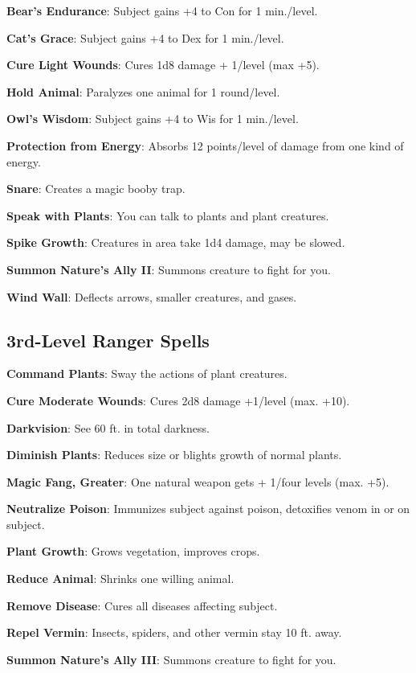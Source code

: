 \textbf{Bear's Endurance}: Subject gains +4 to Con for 1 min./level.

\textbf{Cat's Grace}: Subject gains +4 to Dex for 1 min./level.

\textbf{Cure Light Wounds}: Cures 1d8 damage + 1/level (max +5).

\textbf{Hold Animal}: Paralyzes one animal for 1 round/level.

\textbf{Owl's Wisdom}: Subject gains +4 to Wis for 1 min./level.

\textbf{Protection from Energy}: Absorbs 12 points/level of damage from one kind of energy.

\textbf{Snare}: Creates a magic booby trap.

\textbf{Speak with Plants}: You can talk to plants and plant creatures.

\textbf{Spike Growth}: Creatures in area take 1d4 damage, may be slowed\textit{.}

\textbf{Summon Nature's Ally II}: Summons creature to fight for you.

\textbf{Wind Wall}: Deflects arrows, smaller creatures, and gases.

\subsection{3rd-Level Ranger Spells}


\textbf{Command Plants}: Sway the actions of plant creatures.

\textbf{Cure Moderate Wounds}: Cures 2d8 damage +1/level (max. +10).

\textbf{Darkvision}: See 60 ft. in total darkness.

\textbf{Diminish Plants}: Reduces size or blights growth of normal plants.

\textbf{Magic Fang, Greater}: One natural weapon gets + 1/four levels (max. +5).

\textbf{Neutralize Poison}: Immunizes subject against poison, detoxifies venom in or on subject.

\textbf{Plant Growth}: Grows vegetation, improves crops.

\textbf{Reduce Animal}: Shrinks one willing animal.

\textbf{Remove Disease}: Cures all diseases affecting subject.

\textbf{Repel Vermin}: Insects, spiders, and other vermin stay 10 ft. away.

\textbf{Summon Nature's Ally III}: Summons creature to fight for you.

